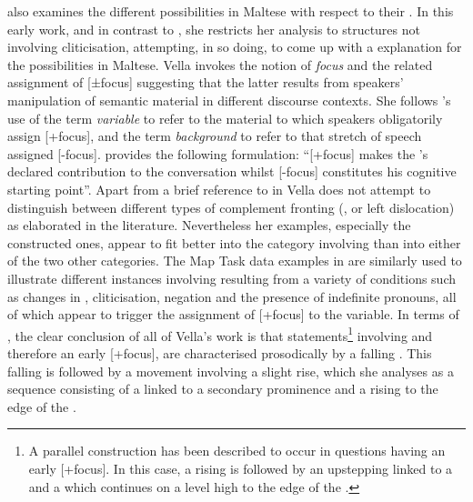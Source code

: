 \documentclass[output=paper]{LSP/langsci}
\begin{document}
\citet{Vella1995} also examines the different  possibilities
in Maltese with respect to their . In this early work, and in
contrast to \citet{FabriBorg2002}, she restricts her analysis to
structures not involving cliticisation, attempting, in so doing, to
come up with a  explanation for the 
possibilities in Maltese. Vella invokes the notion of {\em focus} and
the related assignment of [±focus] \citep{Vella1995, Vella2009}
suggesting that the latter results from speakers’ manipulation of
semantic material in different discourse contexts. She follows
\citet{Gussenhoven83}'s use of the term {\em variable} to refer to the
material to which speakers obligatorily assign [+focus], and the term
{\em background} to refer to that stretch of speech assigned [-focus].
\citet[283]{Gussenhoven83} provides the following formulation:
``[+focus] makes the ’s declared contribution to the
conversation whilst [-focus] constitutes his cognitive starting
point''. Apart from a brief reference to  in \citet{Vella1995}
Vella does not attempt to distinguish between different types of
complement fronting (,  or left
dislocation) as elaborated in the literature. Nevertheless her
examples, especially the constructed ones, appear to fit better into
the category involving  than into either of the two
other categories. The Map Task data examples in \citet{Vella2003, Vella2009}
are similarly used to illustrate different instances involving
 resulting from a variety of conditions such as changes
in , cliticisation, negation and the presence of indefinite
pronouns, all of which appear to trigger the assignment of [+focus] to the
variable.  In terms of , the clear conclusion of all of Vella’s
work is that statements\footnote{A parallel construction has been
  described to occur in questions having an early [+focus]. In this
  case, a rising  is followed by an upstepping 
   linked to a  and a  which
  continues on a level high to the edge of the .}  involving
 and therefore an early [+focus], are characterised
prosodically by a falling . This falling  is
followed by a movement involving a slight rise, which she analyses as a
sequence consisting of a  linked to a secondary
prominence and a  rising to the edge of the .
\end{document}
